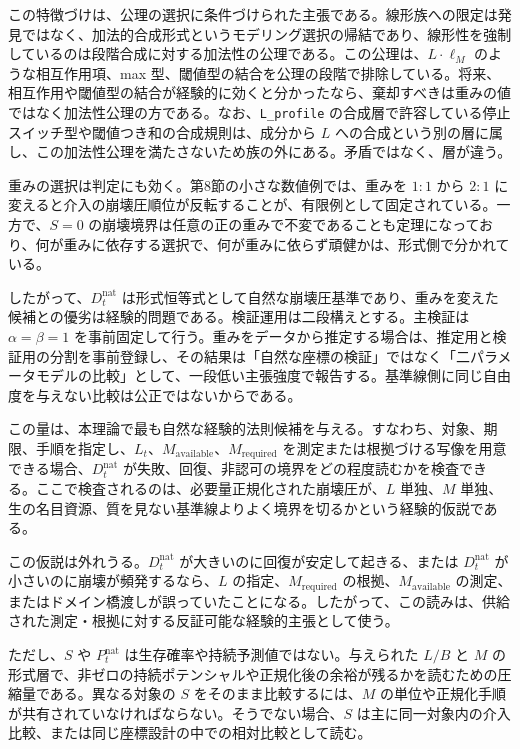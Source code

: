\documentclass[12pt,a4paper]{article}
\begin{document}
この特徴づけは、公理の選択に条件づけられた主張である。線形族への限定は発見ではなく、加法的合成形式というモデリング選択の帰結であり、線形性を強制しているのは段階合成に対する加法性の公理である。この公理は、\(L\cdot\ell_M\) のような相互作用項、max 型、閾値型の結合を公理の段階で排除している。将来、相互作用や閾値型の結合が経験的に効くと分かったなら、棄却すべきは重みの値ではなく加法性公理の方である。なお、\texttt{L\_profile} の合成層で許容している停止スイッチ型や閾値つき和の合成規則は、成分から \(L\) への合成という別の層に属し、この加法性公理を満たさないため族の外にある。矛盾ではなく、層が違う。

重みの選択は判定にも効く。第8節の小さな数値例では、重みを \(1:1\) から \(2:1\) に変えると介入の崩壊圧順位が反転することが、有限例として固定されている。一方で、\(S=0\) の崩壊境界は任意の正の重みで不変であることも定理になっており、何が重みに依存する選択で、何が重みに依らず頑健かは、形式側で分かれている。

したがって、\(D_t^{\mathrm{nat}}\) は形式恒等式として自然な崩壊圧基準であり、重みを変えた候補との優劣は経験的問題である。検証運用は二段構えとする。主検証は \(\alpha=\beta=1\) を事前固定して行う。重みをデータから推定する場合は、推定用と検証用の分割を事前登録し、その結果は「自然な座標の検証」ではなく「二パラメータモデルの比較」として、一段低い主張強度で報告する。基準線側に同じ自由度を与えない比較は公正ではないからである。

この量は、本理論で最も自然な経験的法則候補を与える。すなわち、対象、期限、手順を指定し、\(L_t\)、\(M_{\mathrm{available}}\)、\(M_{\mathrm{required}}\) を測定または根拠づける写像を用意できる場合、\(D_t^{\mathrm{nat}}\) が失敗、回復、非認可の境界をどの程度読むかを検査できる。ここで検査されるのは、必要量正規化された崩壊圧が、\(L\) 単独、\(M\) 単独、生の名目資源、質を見ない基準線よりよく境界を切るかという経験的仮説である。

この仮説は外れうる。\(D_t^{\mathrm{nat}}\) が大きいのに回復が安定して起きる、または \(D_t^{\mathrm{nat}}\) が小さいのに崩壊が頻発するなら、\(L\) の指定、\(M_{\mathrm{required}}\) の根拠、\(M_{\mathrm{available}}\) の測定、またはドメイン橋渡しが誤っていたことになる。したがって、この読みは、供給された測定・根拠に対する反証可能な経験的主張として使う。

ただし、\(S\) や \(P_t^{\mathrm{nat}}\) は生存確率や持続予測値ではない。与えられた \(L/B\) と \(M\) の形式層で、非ゼロの持続ポテンシャルや正規化後の余裕が残るかを読むための圧縮量である。異なる対象の \(S\) をそのまま比較するには、\(M\) の単位や正規化手順が共有されていなければならない。そうでない場合、\(S\) は主に同一対象内の介入比較、または同じ座標設計の中での相対比較として読む。
\end{document}
